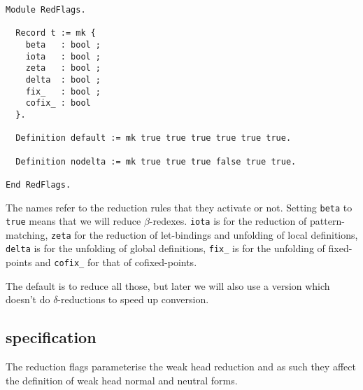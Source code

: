 \begin{verbatim}
Module RedFlags.

  Record t := mk {
    beta   : bool ;
    iota   : bool ;
    zeta   : bool ;
    delta  : bool ;
    fix_   : bool ;
    cofix_ : bool
  }.

  Definition default := mk true true true true true true.

  Definition nodelta := mk true true true false true true.

End RedFlags.
\end{verbatim}

The names refer to the reduction rules that they activate or not.
Setting \texttt{beta} to \texttt{true} means that we will
reduce \(\beta\)-redexes.
\texttt{iota} is for the reduction of pattern-matching,
\texttt{zeta} for the reduction of let-bindings and unfolding of local
definitions, \texttt{delta} is for the unfolding of global definitions,
\texttt{fix_} is for the unfolding of fixed-points and
\texttt{cofix_} for that of cofixed-points.

The default is to reduce all those, but later we will also use a version which
doesn't do \(\delta\)-reductions to speed up conversion.

\subsection{\Coq specification}

The reduction flags parameterise the weak head reduction and as such they
affect the definition of weak head normal and neutral forms.

